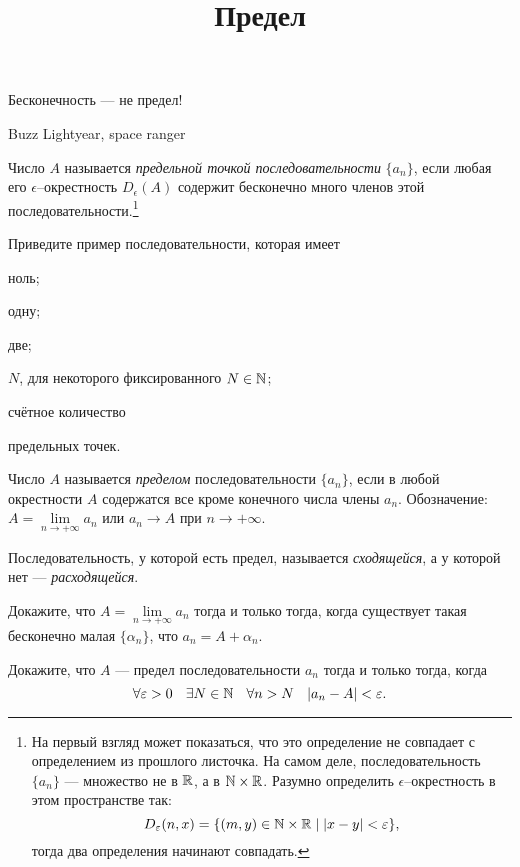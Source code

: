 \documentclass[a4paper, 12pt, num=30]{listok}
\begin{document}
\title{Предел}
\maketitle{}

\epigraph{%
    Бесконечность --- не предел!
}{%
    Buzz Lightyear, space ranger
}
\begin{definition}
    Число $A$ называется \textit{предельной точкой последовательности} $\{a_n\}$,
    если любая его $\epsilon$--окрестность $D_{\epsilon}(A)$ содержит бесконечно много
    членов этой последовательности.\footnote{%
        На первый взгляд может показаться, что это определение не совпадает с определением из прошлого листочка.
        На самом деле, последовательность $\{a_n\}$ --- множество не в $\mathbb{R}$, а в $\mathbb{N} \times \mathbb{R}$.
        Разумно определить $\epsilon$--окрестность в этом пространстве так:
        \[
            D_{\varepsilon}(n, x) = \{ (m, y) \in \mathbb{N} \times \mathbb{R} \mid |x - y| < \varepsilon\},
        \]
        тогда два определения начинают совпадать.
    }
\end{definition}
\begin{problem}
    Приведите пример последовательности, которая имеет
    \begin{probparts}
        \item ноль;
        \item одну;
        \item две;
        \item $N$, для некоторого фиксированного $N \in \mathbb{N}$;
        \item счётное количество
    \end{probparts}
    предельных точек.
\end{problem}
\begin{definition}
    Число $A$ называется \textit{пределом} последовательности $\{a_n\}$,
    если в любой окрестности $A$ содержатся все кроме конечного числа члены $a_n$.
    Обозначение: $A = \lim\limits_{n \to +\infty} a_n$ или $a_n \to A$ при $n \to +\infty$.

    Последовательность, у которой есть предел, называется \textit{сходящейся}, а у которой нет --- \textit{расходящейся}.
\end{definition}
\begin{problem}
    Докажите, что $A = \lim\limits_{n \to +\infty} a_n$ тогда и только тогда, когда существует такая бесконечно малая $\{\alpha_n\}$, что $a_n = A + \alpha_n$.
\end{problem}
\begin{problem}
    Докажите, что $A$ --- предел последовательности $a_n$ тогда и только тогда, когда
    \[
        \forall{\epsilon > 0}\exists{N \in \N}\forall{n > N} |a_n - A| < \epsilon.
    \]
\end{problem}
\end{document}
